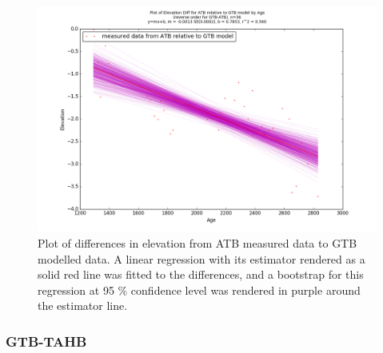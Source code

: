 \begin{figure}[H]
	\includegraphics[width=1.3\linewidth, angle=270 ]{data/bothNonZero/withinSeventyFivePercent/gias/theGIA_ATB_relative_to_GTB.png}
	\caption{Plot of differences in elevation from ATB measured data to GTB modelled data. A linear regression with its estimator rendered as
	 a solid red line was fitted to the differences, and a bootstrap for this regression at 95 \% confidence level was rendered in purple
	 around the estimator line.}
	\label{fig:gias_ATBxGTB}
\end{figure}
\newpage








\subsubsection{GTB-TAHB}

